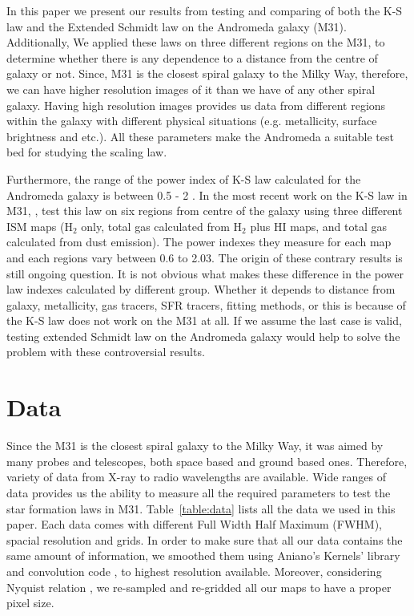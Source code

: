 \documentclass[useAMS,usenatbib]{mn2e}
\begin{document}
In this paper we present our results from testing and comparing of both the K-S law and the Extended Schmidt law on the Andromeda galaxy (M31). %
Additionally, We applied these laws on three different regions on the M31, to determine whether there is any dependence to a distance from the centre of galaxy or not. Since, M31 is the closest spiral galaxy to the Milky Way, therefore, we can have higher resolution images of it than we have of any other spiral galaxy. Having high resolution images provides us data from different regions within
the galaxy with different physical situations (e.g. metallicity, surface brightness and etc.). All these parameters make the Andromeda a suitable test bed for studying the scaling law.

Furthermore, the range of the power index of K-S law calculated for the Andromeda galaxy is between 0.5 - 2 \citep[e.g.,][]{Tabatabaei10,Ford13}. %
In the most recent work on the K-S law in M31, \cite{Ford13}, test this law on six regions from centre of the galaxy using three different ISM maps (H$_2$ only, total gas calculated from H$_2$ plus HI maps, and total gas calculated from dust emission). The power indexes they measure for each map and each regions vary between 0.6 to 2.03. The origin of these contrary results is still ongoing question. It is not obvious what makes these difference in the power law indexes calculated by different group. Whether it depends to distance from galaxy, metallicity, gas tracers, SFR tracers, fitting methods, or this is because of the K-S law does not work on the M31 at all. If we assume the last case is valid, testing extended Schmidt law on the Andromeda galaxy would help to solve the problem with these controversial results.

\section{Data}
\label{sec:data}
Since the M31 is the closest spiral galaxy to the Milky Way, it was aimed by many probes and telescopes, both space based and ground based ones. Therefore, variety of data from X-ray to radio wavelengths are available. Wide ranges of data provides us the ability to measure all the required parameters to test the star formation laws in M31. Table~\ref{table:data} lists all the data we used in this paper. Each data comes with different Full Width Half Maximum (FWHM), spacial resolution and grids. In order to make sure that all our data contains the same amount of information, we smoothed them using Aniano's Kernels' library and convolution code \citep{Aniano12}, to highest resolution available. Moreover, considering Nyquist relation \citep{Nyquist}, we re-sampled and re-gridded all our maps to have a proper pixel size.
\end{document}
